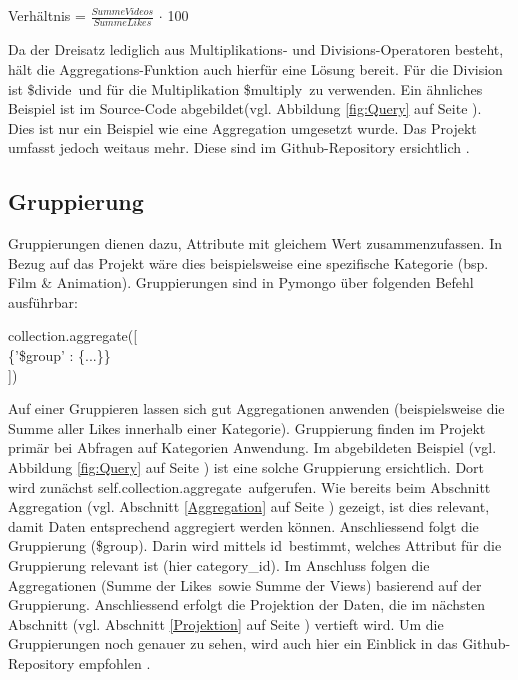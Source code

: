 \documentclass[12pt,titlepage]{article}
\begin{document}
\begin{center}
Verhältnis = $\frac{Summe Videos}{Summe Likes}$ $\cdot$ 100
\end{center}
Da der Dreisatz lediglich aus Multiplikations- und Divisions-Operatoren besteht, hält die Aggregations-Funktion auch hierfür eine Lösung bereit. Für die Division ist \glqq \$divide\grqq\, und für die Multiplikation \glqq \$multiply\grqq\, zu verwenden. Ein ähnliches Beispiel ist im Source-Code abgebildet(vgl. Abbildung \ref{fig:Query} auf Seite \pageref{fig:Query}). Dies ist nur ein Beispiel wie eine Aggregation umgesetzt wurde. Das Projekt umfasst jedoch weitaus mehr. Diese sind im Github-Repository ersichtlich . 

\subsection{Gruppierung}
Gruppierungen dienen dazu, Attribute mit gleichem Wert zusammenzufassen. In Bezug auf das Projekt wäre dies beispielsweise eine spezifische Kategorie (bsp. \glqq Film \& Animation\grqq). Gruppierungen sind in Pymongo über folgenden Befehl ausführbar:
\begin{center}
collection.aggregate([\\\{'\$group' : \{...\}\}\\])
\end{center}
Auf einer Gruppieren lassen sich gut Aggregationen anwenden (beispielsweise die Summe aller Likes innerhalb einer Kategorie). Gruppierung finden im Projekt primär bei Abfragen auf Kategorien Anwendung. Im abgebildeten Beispiel (vgl. Abbildung \ref{fig:Query} auf Seite \pageref{fig:Query}) ist eine solche Gruppierung ersichtlich. Dort wird zunächst \glqq self.collection.aggregate\grqq\, aufgerufen. Wie bereits beim Abschnitt Aggregation (vgl. Abschnitt \ref{Aggregation} auf Seite \pageref{Aggregation}) gezeigt, ist dies relevant, damit Daten entsprechend aggregiert werden können. Anschliessend folgt die Gruppierung (\glqq \$group\grqq). Darin wird mittels \glqq id\grqq\, bestimmt, welches Attribut für die Gruppierung relevant ist (hier \glqq category\_id\grqq). Im Anschluss folgen die Aggregationen (\glqq Summe der Likes\grqq\, sowie \glqq Summe der Views\grqq) basierend auf der Gruppierung. Anschliessend erfolgt die Projektion der Daten, die im nächsten Abschnitt (vgl. Abschnitt \ref{Projektion} auf Seite \pageref{Projektion}) vertieft wird. Um die Gruppierungen noch genauer zu sehen, wird auch hier ein Einblick in das Github-Repository empfohlen .
\end{document}

